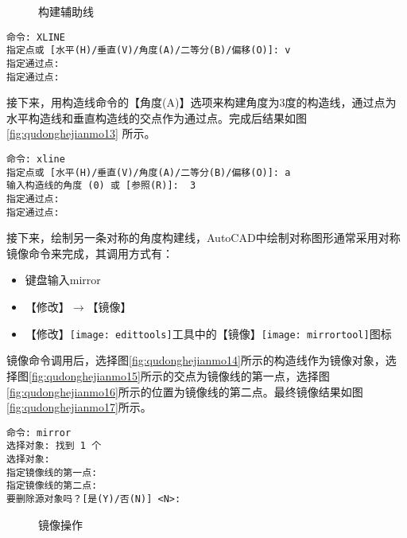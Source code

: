 \begin{procedure}
\begin{figure}[htbp]
\centering
{}\hspace{60pt}
\caption{构建辅助线}
\end{figure}

\begin{lstlisting}
命令: XLINE
指定点或 [水平(H)/垂直(V)/角度(A)/二等分(B)/偏移(O)]: v
指定通过点:
指定通过点:
\end{lstlisting}

接下来，用构造线命令的【角度(A)】选项来构建角度为3度的构造线，通过点为水平构造线和垂直构造线的交点作为通过点。完成后结果如图\ref{fig:qudonghejianmo13} 所示。

\begin{lstlisting}
命令: xline
指定点或 [水平(H)/垂直(V)/角度(A)/二等分(B)/偏移(O)]: a
输入构造线的角度 (0) 或 [参照(R)]:  3
指定通过点:
指定通过点:
\end{lstlisting}

接下来，绘制另一条对称的角度构建线，AutoCAD中绘制对称图形通常采用对称镜像命令来完成，其调用方式有：
\begin{itemize}
	\item 键盘输入mirror
	\item 【修改】$\rightarrow$【镜像】
	\item 【修改】\texttt{[image: edittools]}工具中的【镜像】\texttt{[image: mirrortool]}图标	
\end{itemize}

镜像命令调用后，选择图\ref{fig:qudonghejianmo14}所示的构造线作为镜像对象，选择图\ref{fig:qudonghejianmo15}所示的交点为镜像线的第一点，选择图\ref{fig:qudonghejianmo16}所示的位置为镜像线的第二点。最终镜像结果如图\ref{fig:qudonghejianmo17}所示。
\begin{lstlisting}
命令: mirror
选择对象: 找到 1 个
选择对象:  
指定镜像线的第一点:
指定镜像线的第二点:
要删除源对象吗？[是(Y)/否(N)] <N>:
\end{lstlisting}

\begin{figure}[htbp]
\centering
{}\hspace{20pt}
\hspace{20pt}
\hspace{20pt}
\caption{镜像操作}
\end{figure}


\end{procedure}
